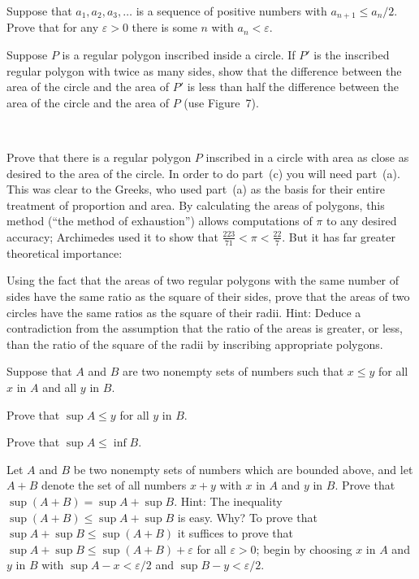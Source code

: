 \begin{letters}
\item Suppose that $a_1, a_2, a_3, \dots$ is a sequence of positive numbers
  with $a_{n+1} \leq a_n/2$. Prove that for any $\varepsilon > 0$ there is
  some $n$ with $a_n < \varepsilon$.
\item Suppose $P$ is a regular polygon inscribed inside a circle. If $P'$ is
  the inscribed regular polygon with twice as many sides, show that the
  difference between the area of the circle and the area of $P'$ is less than
  half the difference between the area of the circle and the area of $P$
  (use Figure~7).
\begin{center}
\\[0.6em]
\end{center}
\item Prove that there is a regular polygon $P$ inscribed in a circle with
  area as close as desired to the area of the circle. In order to do part~(c)
  you will need part~(a). This was clear to the Greeks, who used part~(a) as
  the basis for their entire treatment of proportion and area. By calculating
  the areas of polygons, this method (``the method of exhaustion'') allows
  computations of $\pi$ to any desired accuracy; Archimedes used it to show
  that $\frac{223}{71} < \pi < \frac{22}{7}$. But it has far greater
  theoretical importance:
\item[*(d)] Using the fact that the areas of two regular polygons with the
  same number of sides have the same ratio as the square of their sides,
  prove that the areas of two circles have the same ratios as the square of
  their radii. Hint: Deduce a contradiction from the assumption that the
  ratio of the areas is greater, or less, than the ratio of the square of the
  radii by inscribing appropriate polygons.
\end{letters}

 Suppose that $A$ and $B$ are two nonempty sets of numbers such that
$x \leq y$ for all $x$ in $A$ and all $y$ in $B$.
\begin{letters}
\item Prove that $\sup A \leq y$ for all $y$ in $B$.
\item Prove that $\sup A \leq \inf B$.
\end{letters}

 Let $A$ and $B$ be two nonempty sets of numbers which are bounded
above, and let $A + B$ denote the set of all numbers $x + y$ with $x$ in $A$
and $y$ in $B$. Prove that $\sup(A+B) = \sup A + \sup B$. Hint: The
inequality $\sup(A+B) \leq \sup A + \sup B$ is easy. Why? To prove that
$\sup A + \sup B \leq \sup(A+B)$ it suffices to prove that
$\sup A + \sup B \leq \sup(A+B) + \varepsilon$ for all $\varepsilon > 0$;
begin by choosing $x$ in $A$ and $y$ in $B$ with
$\sup A - x < \varepsilon/2$ and $\sup B - y < \varepsilon/2$.

